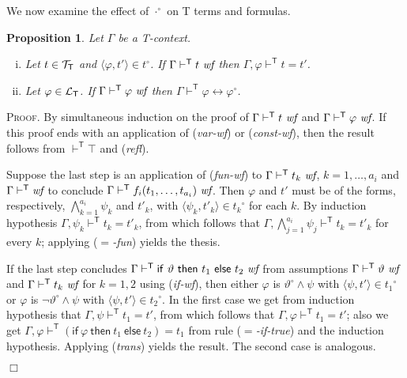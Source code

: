 \documentclass{article}
\newtheorem{proposition}[definition]{Proposition}
\newenvironment{proof}{\smallskip\textsc{Proof.}}{\hspace*{\fill}$\Box$}
\newcommand{\T}{\textsf T}
\newcommand{\ifthelse}[3]{\ensuremath{\mathsf{if}\ {#1}\ \mathsf{then}\ {#2}\ \mathsf{else}\ {#3}}}
\newcommand{\ofun}[1]{\ensuremath{{#1}^\circ}}
\newcommand{\omap}{\ofun\cdot}
\newcommand{\ok}{\mbox{\em wf}}
\newcommand{\wf}{\ \mbox{\em wf}}
\newcommand{\pair}[2]{\ensuremath{\langle{#1},{#2}\rangle}}
\newcommand{\lang}[1]{\ensuremath{{\cal L}_{\mathsf{#1}}}}
\newcommand{\terms}[1]{\ensuremath{{\cal T}_{\mathsf{#1}}}}
\newcommand{\myvdash}[1]{\ensuremath{\vdash^{\mathsf{#1}}}}
\begin{document}
\bigskip\noindent
We now examine the effect of {\omap} on {\T} terms and
formulas.
\begin{proposition}\label{ofunTprops} Let $\Gamma$ be a {\T}-context.
\begin{enumerate}[(i)]
\item Let $t\in\terms T$ and $\pair\varphi{t'}\in\ofun t$.
If $\Gamma\myvdash{T}t\wf$ then $\Gamma,\varphi\myvdash{T} t=t'$.
\item Let $\varphi\in\lang T$.  If $\Gamma\myvdash{T}\varphi\wf$
then $\Gamma\myvdash{T}\varphi\leftrightarrow\ofun\varphi$.
\end{enumerate}
\end{proposition}
\begin{proof}
By simultaneous induction on the proof of $\Gamma\myvdash{T}t\wf$ and
$\Gamma\myvdash{T}\varphi\wf$.
If this proof ends with an application of (\emph{var-wf}) or (\emph{const-wf}),
then the result follows from $\myvdash{T}\top$ and (\emph{refl}).

Suppose the last step is an application of (\emph{fun-wf}) to
$\Gamma\myvdash{T} t_k\wf$, $k=1,\ldots,a_i$ and $\Gamma\myvdash{T}\ok$ to
conclude $\Gamma\myvdash{T} f_i(t_1,\ldots,t_{a_i})\wf$.
Then $\varphi$ and $t'$ must be of the forms, respectively,
$\bigwedge_{k=1}^{a_i}\psi_k$ and $t'_k$, with
$\pair{\psi_k}{t'_k}\in\ofun{t_k}$ for each $k$.  By induction hypothesis
$\Gamma,\psi_k\myvdash{T}t_k=t'_k$, from which follows that
$\Gamma,\bigwedge_{j=1}^{a_i}\psi_j\myvdash{T}t_k=t'_k$ for every $k$;
applying (\emph{$=$-fun}) yields the thesis.

If the last step concludes $\Gamma\myvdash{T}\ifthelse\vartheta{t_1}{t_2}\wf$
from assumptions $\Gamma\myvdash{T}\vartheta\wf$ and $\Gamma\myvdash{T} t_k\wf$
for $k=1,2$ using (\emph{if-wf}), then either $\varphi$ is
$\ofun\vartheta\wedge\psi$ with $\pair\psi{t'}\in\ofun{t_1}$ or $\varphi$
is $\neg\ofun\vartheta\wedge\psi$ with $\pair\psi{t'}\in\ofun{t_2}$.  In
the first case we get from induction hypothesis that
$\Gamma,\psi\myvdash{T} t_1=t'$, from which follows that
$\Gamma,\varphi\myvdash{T} t_1=t'$; also we get
$\Gamma,\varphi\myvdash{T}(\ifthelse\varphi{t_1}{t_2})=t_1$ from rule
(\emph{$=$-if-true}) and the induction hypothesis.  Applying (\emph{trans})
yields the result.  The second case is analogous.


\end{proof}
\end{document}

